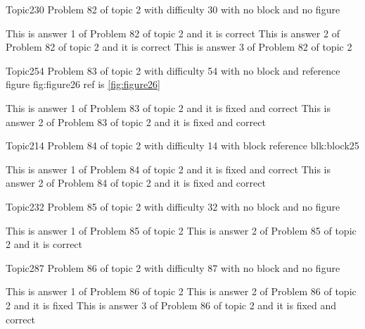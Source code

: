 \documentclass[master]{exam}
\begin{document}
\begin{problem}{Topic2}{30}
	Problem 82 of topic 2 with difficulty 30 with no block and no figure
	\begin{answers}
		\answer[correct] This is answer 1 of Problem 82 of topic 2 and it is correct
		\answer[correct] This is answer 2 of Problem 82 of topic 2 and it is correct
		\answer This is answer 3 of Problem 82 of topic 2 
	\end{answers}
\end{problem}

\begin{problem}{Topic2}{54}
	Problem 83 of topic 2 with difficulty 54 with no block and reference figure fig:figure26 ref is \ref{fig:figure26}
	\begin{answers}
		 This is answer 1 of Problem 83 of topic 2 and it is fixed and correct
		 This is answer 2 of Problem 83 of topic 2 and it is fixed and correct
	\end{answers}
\end{problem}

\begin{problem}[requires=blk:block25]{Topic2}{14}
	Problem 84 of topic 2 with difficulty 14 with block reference blk:block25
	\begin{answers}
		 This is answer 1 of Problem 84 of topic 2 and it is fixed and correct
		 This is answer 2 of Problem 84 of topic 2 and it is fixed and correct
	\end{answers}
\end{problem}

\begin{problem}{Topic2}{32}
	Problem 85 of topic 2 with difficulty 32 with no block and no figure
	\begin{answers}
		\answer This is answer 1 of Problem 85 of topic 2 
		\answer[correct] This is answer 2 of Problem 85 of topic 2 and it is correct
	\end{answers}
\end{problem}

\begin{problem}{Topic2}{87}
	Problem 86 of topic 2 with difficulty 87 with no block and no figure
	\begin{answers}
		\answer This is answer 1 of Problem 86 of topic 2 
		\answer[fixed] This is answer 2 of Problem 86 of topic 2 and it is fixed
		 This is answer 3 of Problem 86 of topic 2 and it is fixed and correct
	\end{answers}
\end{problem}
\end{document}
